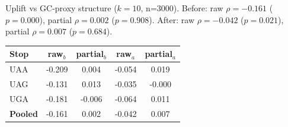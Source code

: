 Uplift vs GC-proxy structure ($k=10$, n=3000). Before: raw $\rho=-0.161$ ($p=0.000$), partial $\rho=0.002$ ($p=0.908$). After: raw $\rho=-0.042$ ($p=0.021$), partial $\rho=0.007$ ($p=0.684$).
\begin{center}\small\begin{tabular}{lcccc}\toprule
Stop & raw$_b$ & partial$_b$ & raw$_a$ & partial$_a$ \\\midrule
UAA & -0.209 & 0.004 & -0.054 & 0.019 \\
UAG & -0.131 & 0.013 & -0.035 & -0.000 \\
UGA & -0.181 & -0.006 & -0.064 & 0.011 \\
\textbf{Pooled} & -0.161 & 0.002 & -0.042 & 0.007 \\
\bottomrule\end{tabular}\end{center}
